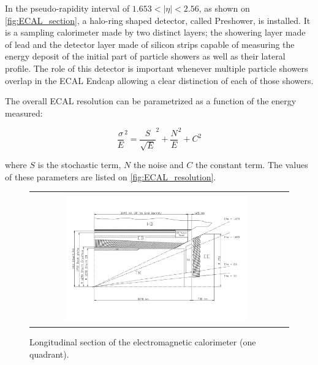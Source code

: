 In the pseudo-rapidity interval of $1.653 < |\eta| < 2.56$, as shown on \autoref{fig:ECAL_section}, a halo-ring shaped detector, called Preshower, is installed. It is a sampling calorimeter made by two distinct layers; the showering layer made of lead and the detector layer made of silicon strips capable of measuring the energy deposit of the initial part of particle showers as well as their lateral profile. The role of this detector is important whenever multiple particle showers overlap in the ECAL Endcap allowing a clear distinction of each of those showers.

The overall ECAL resolution can be parametrized as a function of the energy measured:

\begin{equation}
\dfrac{\sigma}{E}^{2} = \dfrac{S}{\sqrt{E}}^{2} + \dfrac{N}{E}^{2} + C^{2}
\end{equation}

where $S$ is the stochastic term, $N$ the noise and $C$ the constant term. The values of these
parameters are listed on \autoref{fig:ECAL_resolution}.  

\begin{figure}[tbh!]
	\centering
	\begin{tabular}{cc}
		\includegraphics[width=0.75\textwidth]{detector/pics/ECAL_section.pdf}
	\end{tabular}
	\caption{Longitudinal section of the electromagnetic calorimeter (one quadrant).}
	\label{fig:ECAL_section}
\end{figure}

